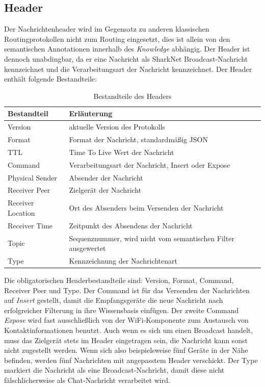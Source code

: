 \subsection{Header}
Der Nachrichtenheader wird im Gegensatz zu anderen klassischen Routingprotokollen nicht zum Routing eingesetzt, dies ist allein von den semantischen Annotationen innerhalb des \textit{Knowledge} abhängig. Der Header ist dennoch unabdingbar, da er eine Nachricht als SharkNet Broadcast-Nachricht kennzeichnet und die Verarbeitungsart der Nachricht kennzeichnet. Der Header enthält folgende Bestandteile:
\begin{table}[H]
	\begin{center}
		\caption{Bestandteile des Headers}
		\label{tab:messageHeader}
		\begin{tabular}{l|l} 			
			Bestandteil & Erläuterung \\
			\hline
			Version & aktuelle Version des Protokolls\\
			Format & Format der Nachricht, standardmäßig JSON\\
			TTL & Time To Live Wert der Nachricht\\
			Command & Verarbeitungsart der Nachricht, Insert oder Expose\\
			Physical Sender & Absender der Nachricht\\
			Receiver Peer & Zielgerät der Nachricht\\
			Receiver Location & Ort des Absenders beim Versenden der Nachricht\\
			Receiver Time & Zeitpunkt des Absendens der Nachricht\\
			Topic & Sequenznummer, wird nicht vom semantischen Filter ausgewertet\\
			Type & Kennzeichnung der Nachrichtenart\\							
		\end{tabular}
	\end{center}
\end{table}
Die obligatorischen Headerbestandteile sind: Version, Format, Command, Receiver Peer und Type. Der Command ist für das Versenden der Nachrichten auf \textit{Insert} gestellt, damit die Empfangsgeräte die neue Nachricht nach erfolgreicher Filterung in ihre Wissensbasis einfügen. Der zweite Command \textit{Expose} wird fast ausschließlich von der WiFi-Komponente zum Austausch von Kontaktinformationen benutzt. Auch wenn es sich um einen Broadcast handelt, muss das Zielgerät stets im Header eingetragen sein, die Nachricht kann sonst nicht zugestellt werden. Wenn sich also beispielsweise fünf Geräte in der Nähe befinden, werden fünf Nachrichten mit angepasstem Header verschickt. Der Type markiert die Nachricht als eine Broadcast-Nachricht, damit diese nicht fälschlicherweise als Chat-Nachricht verarbeitet wird.
